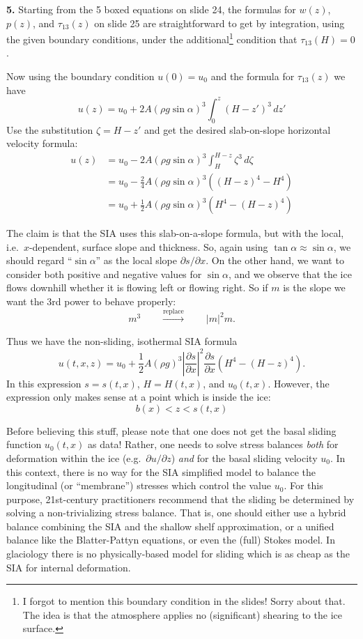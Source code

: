 \documentclass[12pt]{amsart}
\newcommand{\prob}[1]{\bigskip\noindent\textbf{#1.}\quad }
\begin{document}
\prob{5}  Starting from the 5 boxed equations on slide 24, the formulas for $w(z)$, $p(z)$, and $\tau_{13}(z)$ on slide 25 are straightforward to get by integration, using the given boundary conditions, under the additional\footnote{I forgot to mention this boundary condition in the slides!  Sorry about that.  The idea is that the atmosphere applies no (significant) shearing to the ice surface.} condition that $\tau_{13}(H)=0$.

Now using the boundary condition $u(0)=u_0$ and the formula for $\tau_{13}(z)$ we have
    $$u(z) = u_0 + 2 A (\rho g \sin\alpha)^3 \int_0^z (H-z')^3\,dz'$$
Use the substitution $\zeta = H-z'$ and get the desired slab-on-slope horizontal velocity formula:
\begin{align*}
u(z) &= u_0 - 2 A (\rho g \sin\alpha)^3 \int_H^{H-z} \zeta^3\,d\zeta \\
     &= u_0 - \frac{2}{4} A (\rho g \sin\alpha)^3  \left((H-z)^4 - H^4\right) \\
     &= u_0 + \frac{1}{2} A (\rho g \sin\alpha)^3  \left(H^4 - (H-z)^4\right)
\end{align*}

The claim is that the SIA uses this slab-on-a-slope formula, but with the local, i.e.~$x$-dependent, surface slope and thickness.  So, again using $\tan\alpha \approx \sin\alpha$, we should regard ``$\sin\alpha$'' as the local slope $\partial s/\partial x$.  On the other hand, we want to consider both positive and negative values for $\sin\alpha$, and we observe that the ice flows downhill whether it is flowing left or flowing right.  So if $m$ is the slope we want the 3rd power to behave properly:
	$$m^3 \qquad \stackrel{\text{replace}}{\to} \qquad |m|^2 m.$$

Thus we have the non-sliding, isothermal SIA formula
    $$u(t,x,z) = u_0 + \frac{1}{2} A (\rho g)^3 \left|\frac{\partial s}{\partial x}\right|^2 \frac{\partial s}{\partial x} \left(H^4 - (H-z)^4\right).$$
In this expression $s=s(t,x)$, $H=H(t,x)$, and $u_0(t,x)$.  However, the expression only makes sense at a point which is inside the ice:
	$$b(x) < z < s(t,x)$$

Before believing this stuff, please note that one does not get the basal sliding function $u_0(t,x)$ as data!  Rather, one needs to solve stress balances \emph{both} for deformation within the ice (e.g.~$\partial u/\partial z$) \emph{and} for the basal sliding velocity $u_0$.  In this context, there is no way for the SIA simplified model to balance the longitudinal (or ``membrane'') stresses which control the value $u_0$.  For this purpose, 21st-century practitioners recommend that the sliding be determined by solving a non-trivializing stress balance.  That is, one should either use a hybrid balance combining the SIA and the shallow shelf approximation, or a unified balance like the Blatter-Pattyn equations, or even the (full) Stokes model.  In glaciology there is no physically-based model for sliding which is as cheap as the SIA for internal deformation.
\end{document}
